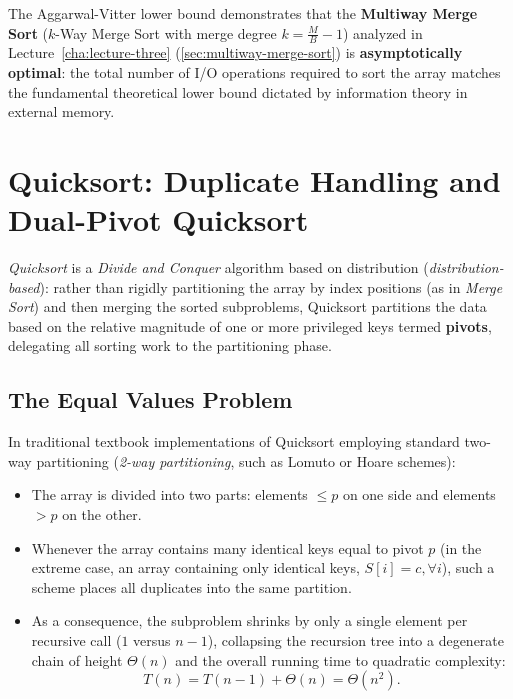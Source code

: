 \begin{property}
The Aggarwal-Vitter lower bound demonstrates that the \textbf{Multiway Merge Sort} ($k$-Way Merge Sort with merge degree $k = \frac{M}{B} - 1$) analyzed in Lecture~\ref{cha:lecture-three} (\autoref{sec:multiway-merge-sort}) is \textbf{asymptotically optimal}: the total number of I/O operations required to sort the array matches the fundamental theoretical lower bound dictated by information theory in external memory.
\end{property}

\FloatBarrier
\section{Quicksort: Duplicate Handling and Dual-Pivot Quicksort}
\label{sec:quicksort-and-dual-pivot}

\textit{Quicksort} is a \textit{Divide and Conquer} algorithm based on distribution (\textit{distribution-based}): rather than rigidly partitioning the array by index positions (as in \textit{Merge Sort}) and then merging the sorted subproblems, Quicksort partitions the data based on the relative magnitude of one or more privileged keys termed \textbf{pivots}, delegating all sorting work to the partitioning phase.

\subsection{The Equal Values Problem}
\label{subsec:equal-values-problem}

In traditional textbook implementations of Quicksort employing standard two-way partitioning (\textit{2-way partitioning}, such as Lomuto or Hoare schemes):
\begin{itemize}
  \item The array is divided into two parts: elements $\le p$ on one side and elements $> p$ on the other.
  \item Whenever the array contains many identical keys equal to pivot $p$ (in the extreme case, an array containing only identical keys, $S[i] = c, \forall i$), such a scheme places all duplicates into the same partition.
  \item As a consequence, the subproblem shrinks by only a single element per recursive call ($1$ versus $n-1$), collapsing the recursion tree into a degenerate chain of height $\Theta(n)$ and the overall running time to quadratic complexity:
  \begin{equation}
    T(n) = T(n - 1) + \Theta(n) = \Theta(n^2).
  \end{equation}
\end{itemize}


